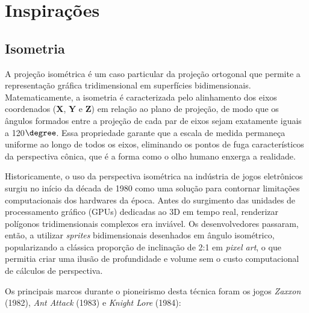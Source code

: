 
\chapter{Inspirações}
\label{cap:inspiracoes}

\section{Isometria}
\label{sec:isometria}

A projeção isométrica é um caso particular da projeção ortogonal que permite a representação
gráfica tridimensional em superfícies bidimensionais. Matematicamente, a isometria é
caracterizada pelo alinhamento dos eixos coordenados (\textbf{X}, \textbf{Y} e \textbf{Z}) em relação ao plano de
projeção, de modo que os ângulos formados entre a projeção de cada par de eixos sejam
exatamente iguais a 120$\degree$. Essa propriedade garante que a escala de medida permaneça
uniforme ao longo de todos os eixos, eliminando os pontos de fuga característicos da
perspectiva cônica, que é a forma como o olho humano enxerga a realidade.

Historicamente, o uso da perspectiva isométrica na indústria de jogos eletrônicos surgiu no
início da década de 1980 como uma solução para contornar limitações computacionais dos
hardwares da época. Antes do surgimento das unidades de processamento gráfico (GPUs)
dedicadas ao 3D em tempo real, renderizar polígonos tridimensionais complexos era inviável.
Os desenvolvedores passaram, então, a utilizar \textit{sprites} bidimensionais desenhados em ângulo
isométrico, popularizando a clássica proporção de inclinação de 2:1 em \textit{pixel art}, o que
permitia criar uma ilusão de profundidade e volume sem o custo computacional de cálculos de
perspectiva.

Os principais marcos durante o pioneirismo desta técnica foram os jogos \textit{Zaxxon} (1982), \textit{Ant Attack} (1983)
e \textit{Knight Lore} (1984):

